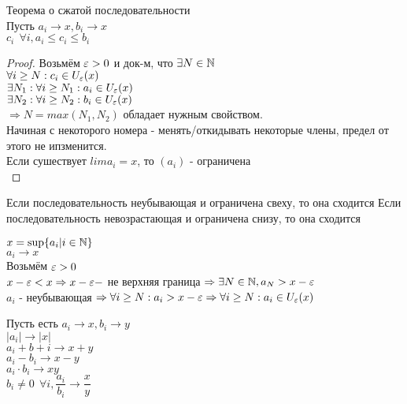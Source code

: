 \begin{theorem} Теорема о сжатой последовательности\\
Пусть $ a_i \rightarrow x, b_i \rightarrow x $ \\
$ c_i \ \ \forall i, a_i \leq c_i \leq b_i $ \\
\begin{proof}
Возьмём $ \varepsilon > 0 $ и док-м, что $ \exists N \in \mathbb{N} $ \\
$ \forall i \geq N : c_i \in U_{\varepsilon} (x) $ \\
$ \exists N_1 : \forall i \geq N_1 : a_i \in U_{\varepsilon} (x) $\\
$ \exists N_2 : \forall i \geq N_2 : b_i \in U_{\varepsilon} (x) $\\
$ \Rightarrow N = max(N_1, N_2) $ обладает нужным свойством. \\
Начиная с некоторого номера - менять/откидывать некоторые члены, предел от этого не ипзменится. \\

Если сушествует $ lim a_i = x $, то $(a_i)$ - ограничена\\
\end{proof}
\end{theorem}

Если последовательность неубывающая и ограничена свеху, то она сходится
Если последовательность невозрастающая и ограничена снизу, то она сходится

$ x = \sup\{a_i | i \in \mathbb{N}\} $ \\
$ a_i \rightarrow x $\\
Возьмём $ \varepsilon > 0 $\\
$ x - \varepsilon < x \Rightarrow x - \varepsilon  - $ не верхняя граница $ \Rightarrow \exists N \in \mathbb{N}, a_N > x-\varepsilon $ \\
$ a_i $ - неубывающая $ \Rightarrow \forall i \geq N : a_i > x-\varepsilon \Rightarrow \forall i \geq N : a_i \in U_{\varepsilon} (x)$\\


Пусть есть $ a_i \rightarrow x, b_i \rightarrow y $ \\
$ |a_i| \rightarrow |x| $\\
$ a_i + b+i \rightarrow x+y $ \\
$ a_i - b_i \rightarrow x - y$\\
$ a_i \cdot b_i \rightarrow xy $ \\
$ b_i \neq 0 \ \  \forall i, \dfrac{ a_i}{b_i} \rightarrow \dfrac{x}{y} $\\

